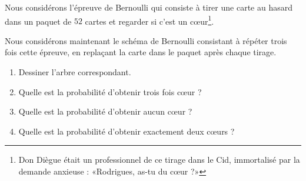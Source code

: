 
\begin{exercice}\label{exoPremiere-0074}

    Nous considérons l'épreuve de Bernoulli qui consiste à tirer une carte au hasard dans un paquet de \( 52\) cartes et regarder si c'est un cœur\footnote{Don Diègue était un professionnel de ce tirage dans le Cid, immortalisé par la demande anxieuse : «Rodrigues, as-tu du cœur ?»}.

    Nous considérons maintenant le schéma de Bernoulli consistant à répéter trois fois cette épreuve, en replaçant la carte dans le paquet après chaque tirage.
    \begin{enumerate}
        \item
            Dessiner l'arbre correspondant.
\item
    Quelle est la probabilité d'obtenir trois fois cœur ?
\item
    Quelle est la probabilité d'obtenir aucun cœur ?
\item
    Quelle est la probabilité d'obtenir exactement deux cœurs ?
            
    \end{enumerate}

\end{exercice}
